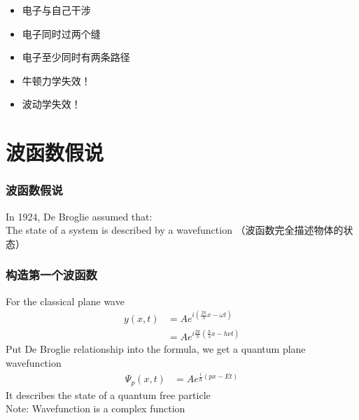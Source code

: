 \begin{frame}
\begin{itemize}
    \item  电子与自己干涉 
    \item  电子同时过两个缝  
    \item  电子至少同时有两条路径 
    \item  牛顿力学失效！ 
    \item  波动学失效！ 
\end{itemize}
\end{frame}

\section{波函数假说}

\begin{frame}
    \frametitle{波函数假说}
    \begin{tcolorbox}[colback=yellow!10,colframe=red!75!black,title=Basic assumption 1/5]
    In 1924, De Broglie assumed that:\\
    The state of a system is described by a wavefunction （波函数完全描述物体的状态）
    \end{tcolorbox}
\end{frame}

\begin{frame}
    \frametitle{构造第一个波函数}
        For the classical plane wave
        \begin{equation*}
            \begin{split}
                y(x,t)&=A e^{i(\frac{2\pi}{\lambda}x-\omega t)} \\
                    & = A e^{i\frac{2\pi}{h}(\frac{h}{\lambda}x-h\nu t)}
            \end{split} 
        \end{equation*}
        Put De Broglie relationship into the formula, we get a quantum plane wavefunction
        \begin{equation*}
            \begin{split}
                \Psi_p(x,t)&=A e^{\frac{i}{\hbar}(px-Et)}
            \end{split} 
         \end{equation*}
         It describes the state of a quantum free particle\\
         Note: Wavefunction is a complex function 
\end{frame}

